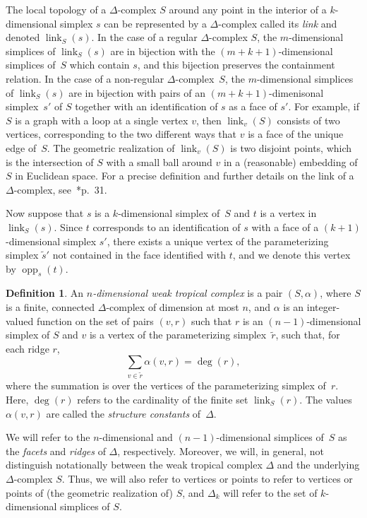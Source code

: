 \documentclass[11pt,reqno]{amsart}
\theoremstyle{definition}
\newtheorem{defn}[thm]{Definition}
\newcommand{\defi}[1]{\emph{#1}}
\newcommand{\link}{\operatorname{link}}
\newcommand{\opp}{\operatorname{opp}}
\begin{document}
The local topology of a $\Delta$-complex $S$ around any point in the interior of
a $k$-dimensional simplex $s$ can be represented by a $\Delta$-complex called
its \defi{link} and denoted $\link_S(s)$. In the case of a regular
$\Delta$-complex
$S$, the $m$-dimensional simplices of $\link_S(s)$ are in bijection with the
$(m+k+1)$-dimensional simplices of~$S$ which contain $s$, and this
bijection preserves the containment relation. In the case of a non-regular
$\Delta$-complex~$S$, the $m$-dimensional simplices of $\link_S(s)$ are in
bijection with pairs of an $(m+k+1)$-dimenisonal simplex~$s'$ of $S$ together
with an identification of $s$ as a face of $s'$. For example, if $S$ is a graph
with a loop at a single vertex $v$, then $\link_v(S)$ consists of two vertices,
corresponding to the two different ways that $v$ is a
face of the unique edge of~$S$. The geometric realization of $\link_v(S)$ is two
disjoint points, which is the intersection of $S$ with a small ball around $v$
in a (reasonable) embedding of $S$ in Euclidean space. For a precise definition and further details on the link of a
$\Delta$-complex, see~\cite{kozlov}*{p.~31}.

Now suppose that $s$ is a $k$-dimensional simplex of~$S$ and $t$ is a
vertex in $\link_S(s)$. Since $t$ corresponds to an identification of $s$
with a face of a $(k+1)$-dimensional simplex $s'$, there exists a
unique vertex of the parameterizing simplex $\tilde s'$ not contained in the
face identified with $t$, and we denote this vertex by $\opp_s(t)$.

\begin{defn}\label{d:weak-tropical-complex}
An \defi{$n$-dimensional weak tropical complex} is a pair $(S, \alpha)$, where
$S$ is a finite, connected $\Delta$-complex of dimension at most $n$, and $\alpha$ is an
integer-valued function on the set of pairs $(v,r)$ such that $r$ is an
$(n-1)$-dimensional simplex of $S$ and $v$ is a vertex of the parameterizing
simplex~$\tilde r$,
such that, for each ridge $r$, \begin{equation}\label{eq:constraint}
\sum_{v \in \tilde r} \alpha(v, r) = \deg(r),
\end{equation}
where the summation is over the vertices of the parameterizing simplex of~$r$.
Here, $\deg(r)$ refers to the cardinality of the finite set $\link_S(r)$. 
The values $\alpha(v,r)$ are called the \defi{structure
constants} of~$\Delta$.

We will refer to the $n$-dimensional and $(n-1)$-dimensional simplices of~$S$ as
the \defi{facets} and \defi{ridges} of $\Delta$, respectively. Moreover, we
will, in general, not distinguish notationally between the weak tropical complex
$\Delta$ and the underlying $\Delta$-complex $S$. Thus, we will also refer to
vertices or points
to refer to vertices or points of (the geometric realization of) $S$, and
$\Delta_k$ will refer to the set of $k$-dimensional simplices of $S$.
\end{defn}
\end{document}
